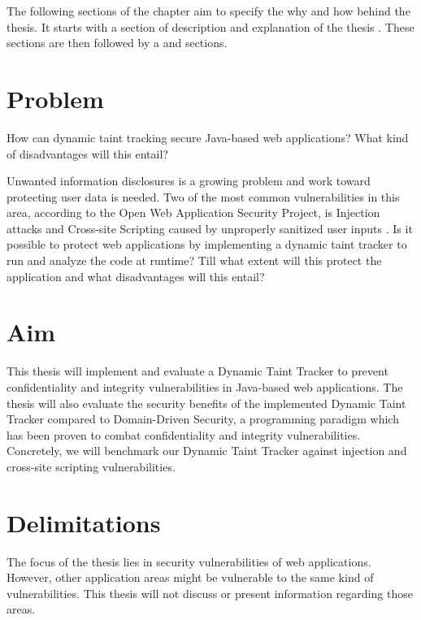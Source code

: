 The following sections of the chapter aim to specify the why and how behind the thesis. It starts with a section of \textit{} description and explanation of the thesis \textit{}. These sections are then followed by a \textit{} and \textit{} sections.



\section{Problem}
\label{Problem}
\begin{chapquote}{}
    How can dynamic taint tracking secure Java-based web applications? What kind of disadvantages will this entail?
\end{chapquote}

\noindent
Unwanted information disclosures is a growing problem and work toward protecting user data is needed. Two of the most common vulnerabilities in this area, according to the Open Web Application Security Project, is Injection attacks and Cross-site Scripting caused by unproperly sanitized user inputs \parencite{OWASP2017}. Is it possible to protect web applications by implementing a dynamic taint tracker to run and analyze the code at runtime? Till what extent will this protect the application and what disadvantages will this entail?



\section{Aim}
\label{Aim}
This thesis will implement and evaluate a Dynamic Taint Tracker to prevent confidentiality and integrity vulnerabilities in Java-based web applications. The thesis will also evaluate the security benefits of the implemented Dynamic Taint Tracker compared to Domain-Driven Security, a programming paradigm which has been proven to combat confidentiality and integrity vulnerabilities. Concretely, we will benchmark our Dynamic Taint Tracker against injection and cross-site scripting vulnerabilities.



\section{Delimitations}
\label{Delimitations}
The focus of the thesis lies in security vulnerabilities of web applications. However, other application areas might be vulnerable to the same kind of vulnerabilities.  This thesis will not discuss or present information regarding those areas.

